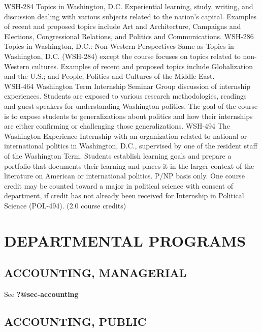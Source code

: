 \documentclass[
  letterpaper,
]{scrbook}
\begin{document}
WSH-284 Topics in Washington, D.C. Experiential learning, study,
writing, and discussion dealing with various subjects related to the
nation's capital. Examples of recent and proposed topics include Art and
Architecture, Campaigns and Elections, Congressional Relations, and
Politics and Communications. WSH-286 Topics in Washington, D.C.:
Non-Western Perspectives Same as Topics in Washington, D.C. (WSH-284)
except the course focuses on topics related to non-Western cultures.
Examples of recent and proposed topics include Globalization and the
U.S.; and People, Politics and Cultures of the Middle East.\\
WSH-464 Washington Term Internship Seminar Group discussion of
internship experiences. Students are exposed to various research
methodologies, readings and guest speakers for understanding Washington
politics. The goal of the course is to expose students to
generalizations about politics and how their internships are either
confirming or challenging those generalizations. WSH-494 The Washington
Experience Internship with an organization related to national or
international politics in Washington, D.C., supervised by one of the
resident staff of the Washington Term. Students establish learning goals
and prepare a portfolio that documents their learning and places it in
the larger context of the literature on American or international
politics. P/NP basis only. One course credit may be counted toward a
major in political science with consent of department, if credit has not
already been received for Internship in Political Science (POL-494).
(2.0 course credits)

\hypertarget{departmental-programs}{%
\chapter{DEPARTMENTAL PROGRAMS}\label{departmental-programs}}

\hypertarget{accounting-managerial}{%
\section{ACCOUNTING, MANAGERIAL}\label{accounting-managerial}}

See \textbf{?@sec-accounting}

\hypertarget{accounting-public}{%
\section{ACCOUNTING, PUBLIC}\label{accounting-public}}
\end{document}

